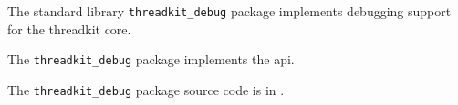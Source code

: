 
The standard library {\tt threadkit\_debug} package implements debugging support for the threadkit core.

The {\tt threadkit\_debug} package implements the  api.

The {\tt threadkit\_debug} package source code is in .
